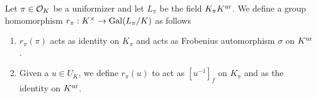 Let $\pi \in \mathcal{O}_K$ be a uniformizer and let $L_\pi$ be the field $K_\pi K^{\mathrm{ur}}$. We define a group homomorphism
$r_\pi : K^\times \to \mathrm{Gal}(L_\pi / K)$ as follows
\begin{enumerate}
    \item $r_\pi (\pi)$ acts as identity on $K_\pi$ and acts as Frobenius automorphism $\sigma$ on
        $K^{\mathrm{ur}}$.
    \item Given a $u \in U_K$, we define $r_\pi (u)$ to act as $[u^{-1}]_f$ on $K_\pi$ and
        as the identity on $K^{\mathrm{ur}}$.
\end{enumerate}









